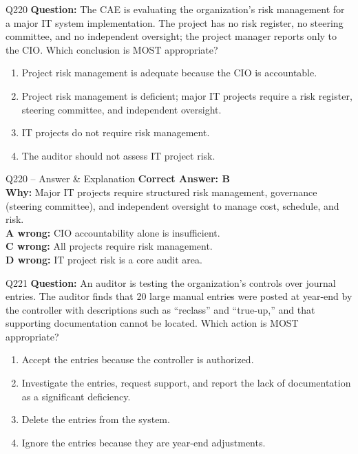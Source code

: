 \documentclass[aspectratio=169,10pt]{beamer}
\begin{document}
	\begin{frame}[t]{Q220}
		\small
		\textbf{Question:} The CAE is evaluating the organization's risk management for a major IT system implementation. The project has no risk register, no steering committee, and no independent oversight; the project manager reports only to the CIO. Which conclusion is MOST appropriate?
		\begin{enumerate}[label=\Alph*.,itemsep=1pt,topsep=2pt]
			\item Project risk management is adequate because the CIO is accountable.
			\item Project risk management is deficient; major IT projects require a risk register, steering committee, and independent oversight.
			\item IT projects do not require risk management.
			\item The auditor should not assess IT project risk.
		\end{enumerate}
	\end{frame}
	
	\begin{frame}[t]{Q220 -- Answer \& Explanation}
		\small
		\textbf{Correct Answer: B} \\[4pt]
		\textbf{Why:} Major IT projects require structured risk management, governance (steering committee), and independent oversight to manage cost, schedule, and risk. \\[4pt]
		\textbf{A wrong:} CIO accountability alone is insufficient. \\[2pt]
		\textbf{C wrong:} All projects require risk management. \\[2pt]
		\textbf{D wrong:} IT project risk is a core audit area.
	\end{frame}
	
	\begin{frame}[t]{Q221}
		\small
		\textbf{Question:} An auditor is testing the organization's controls over journal entries. The auditor finds that 20 large manual entries were posted at year-end by the controller with descriptions such as ``reclass'' and ``true-up,'' and that supporting documentation cannot be located. Which action is MOST appropriate?
		\begin{enumerate}[label=\Alph*.,itemsep=1pt,topsep=2pt]
			\item Accept the entries because the controller is authorized.
			\item Investigate the entries, request support, and report the lack of documentation as a significant deficiency.
			\item Delete the entries from the system.
			\item Ignore the entries because they are year-end adjustments.
		\end{enumerate}
	\end{frame}
	
\end{document}
